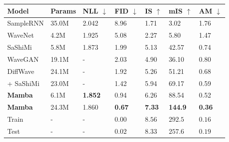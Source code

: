 \begin{tabular}{lllllll}
\hline
Model & Params & NLL $\downarrow$ & FID $\downarrow$ & IS $\uparrow$ & mIS $\uparrow$ & AM $\downarrow$ \\
\hline
SampleRNN & 35.0M & 2.042 & 8.96 & 1.71 & 3.02 & 1.76 \\
WaveNet & 4.2M & 1.925 & 5.08 & 2.27 & 5.80 & 1.47 \\
SaShiMi & 5.8M & 1.873 & 1.99 & 5.13 & 42.57 & 0.74 \\
\hline
WaveGAN & 19.1M & - & 2.03 & 4.90 & 36.10 & 0.80 \\
DiffWave & 24.1M & - & 1.92 & 5.26 & 51.21 & 0.68 \\
+ SaShiMi & 23.0M & - & 1.42 & 5.94 & 69.17 & 0.59 \\
\hline
\textbf{Mamba} & 6.1M & \textbf{1.852} & 0.94 & 6.26 & 88.54 & 0.52 \\
\textbf{Mamba} & 24.3M & 1.860 & \textbf{0.67} & \textbf{7.33} & \textbf{144.9} & \textbf{0.36} \\
\hline
Train & - & - & $0.00$ & $8.56$ & $292.5$ & $0.16$ \\
Test & - & - & $0.02$ & $8.33$ & $257.6$ & $0.19$ \\
\hline
\end{tabular}
